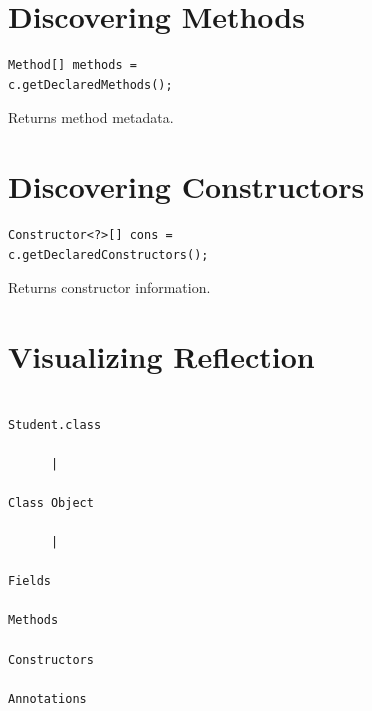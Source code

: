 \documentclass[11pt,a4paper]{book}
\begin{document}
\section{Discovering Methods}

\begin{verbatim} 
Method[] methods =
c.getDeclaredMethods();
\end{verbatim}


Returns method metadata.


\section{Discovering Constructors}

\begin{verbatim} 
Constructor<?>[] cons =
c.getDeclaredConstructors();
\end{verbatim}


Returns constructor information.


\section{Visualizing Reflection}

\begin{verbatim}

Student.class

      |

Class Object

      |

Fields

Methods

Constructors

Annotations

\end{verbatim}
\end{document}
